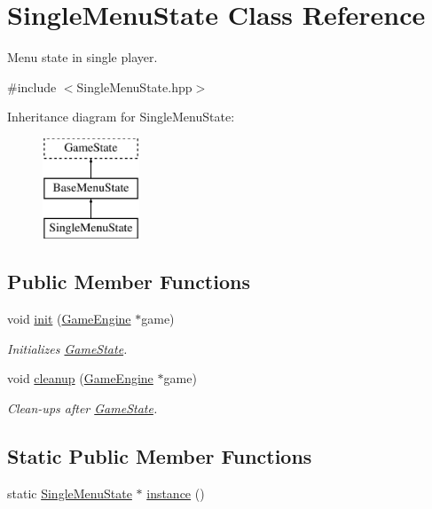 \hypertarget{class_single_menu_state}{}\section{Single\+Menu\+State Class Reference}
\label{class_single_menu_state}


Menu state in single player.  




{\ttfamily \#include $<$Single\+Menu\+State.\+hpp$>$}

Inheritance diagram for Single\+Menu\+State\+:\begin{figure}[H]
\begin{center}
\leavevmode
\includegraphics[height=3.000000cm]{class_single_menu_state}
\end{center}
\end{figure}
\subsection*{Public Member Functions}
\begin{DoxyCompactItemize}
\item 
void \mbox{\hyperlink{class_single_menu_state_a9494d848c97fe4d406f122f3d97bc38d}{init}} (\mbox{\hyperlink{class_game_engine}{Game\+Engine}} $\ast$game)
\begin{DoxyCompactList}\small\item\em Initializes \mbox{\hyperlink{class_game_state}{Game\+State}}. \end{DoxyCompactList}\item 
void \mbox{\hyperlink{class_single_menu_state_a61fdbb1a47f269d9f99f99ef9312624f}{cleanup}} (\mbox{\hyperlink{class_game_engine}{Game\+Engine}} $\ast$game)
\begin{DoxyCompactList}\small\item\em Clean-\/ups after \mbox{\hyperlink{class_game_state}{Game\+State}}. \end{DoxyCompactList}\end{DoxyCompactItemize}
\subsection*{Static Public Member Functions}
\begin{DoxyCompactItemize}
\item 
static \mbox{\hyperlink{class_single_menu_state}{Single\+Menu\+State}} $\ast$ \mbox{\hyperlink{class_single_menu_state_a608d05075dbe38e9e9a84b189b89d411}{instance}} ()
\end{DoxyCompactItemize}
